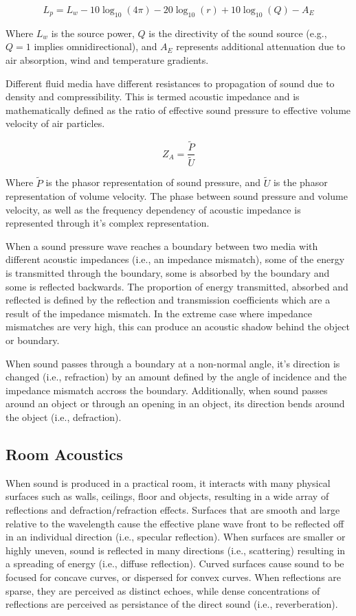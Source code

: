 \[L_p = L_w - 10\log_{10}(4\pi) - 20\log_{10}(r)  + 10\log_{10}(Q) - A_E\]

Where $L_w$ is the source power, $Q$ is the directivity of the sound source (e.g., $Q=1$ implies omnidirectional), and $A_E$ represents additional attenuation due to air absorption, wind and temperature gradients.

Different fluid media have different resistances to propagation of sound due to density and compressibility. This is termed acoustic impedance and is mathematically defined as the ratio of effective sound pressure to effective volume velocity of air particles.

\[Z_A=\frac{\tilde{P}}{\tilde{U}}\]

Where $\tilde{P}$ is the phasor representation of sound pressure, and $\tilde{U}$ is the phasor representation of volume velocity. The phase between sound pressure and volume velocity, as well as the frequency dependency of acoustic impedance is represented through it's complex representation.

When a sound pressure wave reaches a boundary between two media with different acoustic impedances (i.e., an impedance mismatch), some of the energy is transmitted through the boundary, some is absorbed by the boundary and some is reflected backwards. The proportion of energy transmitted, absorbed and reflected is defined by the reflection and transmission coefficients which are a result of the impedance mismatch. In the extreme case where impedance mismatches are very high, this can produce an acoustic shadow behind the object or boundary. 

When sound passes through a boundary at a non-normal angle, it's direction is changed (i.e., refraction) by an amount defined by the angle of incidence and the impedance mismatch accross the boundary. Additionally, when sound passes around an object or through an opening in an object, its direction bends around the object (i.e., defraction).


\subsection{Room Acoustics}

When sound is produced in a practical room, it interacts with many physical surfaces such as walls, ceilings, floor and objects, resulting in a wide array of reflections and defraction/refraction effects. Surfaces that are smooth and large relative to the wavelength cause the effective plane wave front to be reflected off in an individual direction (i.e., specular reflection). When surfaces are smaller or highly uneven, sound is reflected in many directions (i.e., scattering) resulting in a spreading of energy (i.e., diffuse reflection). Curved surfaces cause sound to be focused for concave curves, or dispersed for convex curves. When reflections are sparse, they are perceived as distinct echoes, while dense concentrations of reflections are perceived as persistance of the direct sound (i.e., reverberation). 

